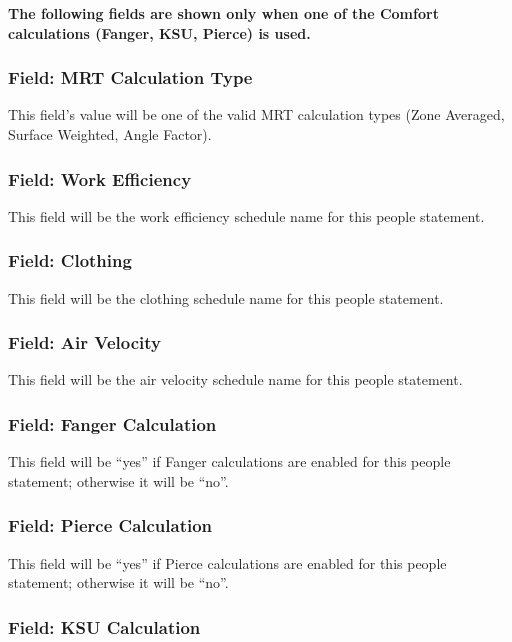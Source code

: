 \textbf{The following fields are shown only when one of the Comfort calculations (Fanger, KSU, Pierce) is used.}

\subsubsection{Field: MRT Calculation Type}\label{field-mrt-calculation-type}

This field's value will be one of the valid MRT calculation types (Zone Averaged, Surface Weighted, Angle Factor).

\subsubsection{Field: Work Efficiency}\label{field-work-efficiency}

This field will be the work efficiency schedule name for this people statement.

\subsubsection{Field: Clothing}\label{field-clothing}

This field will be the clothing schedule name for this people statement.

\subsubsection{Field: Air Velocity}\label{field-air-velocity}

This field will be the air velocity schedule name for this people statement.

\subsubsection{Field: Fanger Calculation}\label{field-fanger-calculation}

This field will be ``yes'' if Fanger calculations are enabled for this people statement; otherwise it will be ``no''.

\subsubsection{Field: Pierce Calculation}\label{field-pierce-calculation}

This field will be ``yes'' if Pierce calculations are enabled for this people statement; otherwise it will be ``no''.

\subsubsection{Field: KSU Calculation}\label{field-ksu-calculation}

